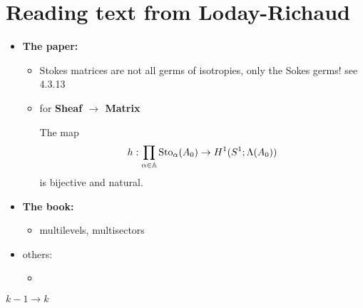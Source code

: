 \section{Reading text from Loday-Richaud}
\begin{itemize}
  \item \textbf{The paper:}
    \cite{Loday1994}
    \begin{itemize}
      \item Stokes matrices are not all germs of isotropies, only the Sokes
        germs! see 4.3.13
      \item for \textbf{Sheaf $\to$ Matrix}
        \begin{thm}[II.2.1]
          The map
          \[
            h:\prod_{\alpha\in\mathbb{A}}\operatorname{Sto}_\alpha(A_0)\to H^1(S^1;\Lambda(A_0))
          \]
          is bijective and natural.
        \end{thm}
    \end{itemize}
  \item \textbf{The book:} \cite{lodayrichaud:hal-01011050}
    \begin{itemize}
      \item multilevels, multisectors
    \end{itemize}
  \item others:
    \begin{itemize}
      \item \cite{LodayRichaud2004}
    \end{itemize}
\end{itemize}

$k -1 \to k$

